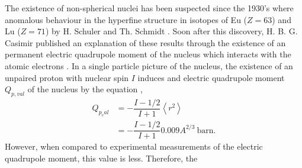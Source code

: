 \documentclass[8pt,a4paper, twoside]{report}
\begin{document}
The existence of non-spherical nuclei has been suspected since the 1930's where anomalous behaviour in the hyperfine structure in isotopes of Eu ($Z=63$) and Lu ($Z=71$) by H. Schuler and Th. Schmidt \cite{Schuler1935(1), Schuler1935(2)}. Soon after this discovery, H. B. G. Casimir published an explanation of these results through the existence of an permanent electric quadrupole moment of the nucleus which interacts with the atomic electrons \cite{Casimir1935, Casimir1936}. In a single particle picture of the nucleus, the existence of an unpaired proton with nuclear spin $I$ induces and electric quadrupole moment  $Q_{p,val}$ of the nucleus by the equation \cite{BohrMottVol1},
\begin{align}
Q_{p_val} &= - \dfrac{I-1/2}{I + 1}\left<r^2\right> \nonumber \\
&=  - \dfrac{I-1/2}{I + 1}0.009A^{2/3} \ \text{barn}.
\end{align}  
However, when compared to experimental measurements of the electric quadrupole moment, this value is less. Therefore, the 
\end{document}
